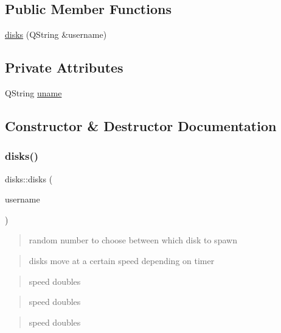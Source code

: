 \subsection*{Public Member Functions}
\begin{DoxyCompactItemize}
\item 
\hyperlink{classdisks_ad7db6d6d8d1229f480da7c095ec29130}{disks} (Q\+String \&username)
\end{DoxyCompactItemize}
\subsection*{Private Attributes}
\begin{DoxyCompactItemize}
\item 
Q\+String \hyperlink{classdisks_ae8b7e45a0c6d5c5f34b006ff825e6238}{uname}
\end{DoxyCompactItemize}


\subsection{Constructor \& Destructor Documentation}
\mbox{\label{classdisks_ad7db6d6d8d1229f480da7c095ec29130}} 
\subsubsection{\texorpdfstring{disks()}{disks()}}
{\footnotesize\ttfamily disks\+::disks (\begin{DoxyParamCaption}\item[{Q\+String \&}]{username }\end{DoxyParamCaption})}

\begin{quote}
random number to choose between which disk to spawn \end{quote}


\begin{quote}
disks move at a certain speed depending on timer \end{quote}


\begin{quote}
speed doubles \end{quote}


\begin{quote}
speed doubles \end{quote}


\begin{quote}
speed doubles \end{quote}



